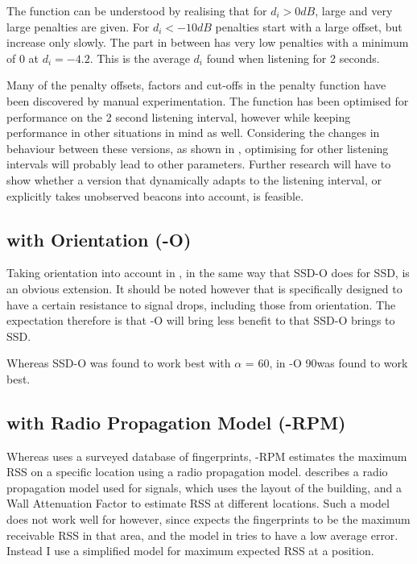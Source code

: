 The function can be understood by realising that for $d_i > 0dB$, large and very large penalties are given.
For $d_i < -10dB$ penalties start with a large offset, but increase only slowly.
The part in between has very low penalties with a minimum of 0 at $d_i = -4.2$.
This is the average $d_i$ found when listening for 2 seconds.

Many of the penalty offsets, factors and cut-offs in the \aBRP penalty function have been discovered by manual experimentation.
The function has been optimised for performance on the 2 second listening interval, however while keeping performance in other situations in mind as well.
Considering the changes in behaviour between these versions, as shown in , optimising for other listening intervals will probably lead to other parameters.
Further research will have to show whether a version that dynamically adapts to the listening interval, or explicitly takes unobserved beacons into account, is feasible.

\subsection{\BRP with Orientation (\aBRP-O)}
Taking orientation into account in \aBRP, in the same way that SSD-O does for SSD, is an obvious extension.
It should be noted however that \aBRP is specifically designed to have a certain resistance to signal drops, including those from orientation.
The expectation therefore is that \aBRP-O will bring less benefit to \aBRP that SSD-O brings to SSD.

Whereas SSD-O was found to work best with $\alpha$ = 60\textdegree, in \aBRP-O 90\textdegree was found to work best.

\subsection{\BRP with Radio Propagation Model (\aBRP-RPM)}
Whereas \aBRP uses a surveyed database of fingerprints, \aBRP-RPM estimates the maximum RSS on a specific location using a radio propagation model.
\citet{bahl2000radar} describes a radio propagation model used for \wifi signals, which uses the layout of the building, and a Wall Attenuation Factor to estimate RSS at different locations.
Such a model does not work well for \aBRP however, since \aBRP expects the fingerprints to be the maximum receivable RSS in that area, and the model in \citet{bahl2000radar} tries to have a low average error.
Instead I use a simplified model for maximum expected RSS at a position.

